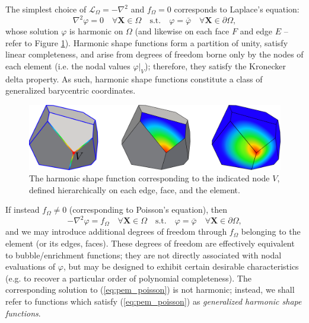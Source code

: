	The simplest choice of $\mathcal{L}_{\Omega} = -\nabla^2$ and $f_{\Omega} = 0$ corresponds to Laplace's equation:
	\begin{equation}
		\nabla^2 \varphi = 0 \quad \forall \mathbf{X} \in \Omega \quad \text{s.t.} \quad \varphi = \bar{\varphi} \quad \forall \mathbf{X} \in \partial \Omega,
		\label{eq:pem_laplace}
	\end{equation}
	whose solution $\varphi$ is harmonic on $\Omega$ (and likewise on each face $F$ and edge $E$ -- refer to Figure \ref{fig:harmonic_sfs}). Harmonic shape functions form a partition of unity, satisfy linear completeness, and arise from degrees of freedom borne only by the nodes of each element (i.e. the nodal values $\varphi|_V$); therefore, they satisfy the Kronecker delta property. As such, harmonic shape functions constitute a class of generalized barycentric coordinates.
	
\begin{figure} [!ht]
	\centering
	\includegraphics[width = 6.0in]{figures/harmonic_sfs.pdf}
	\caption{The harmonic shape function corresponding to the indicated node $V$, defined hierarchically on each edge, face, and the element.}
	\label{fig:harmonic_sfs}
\end{figure}
	
	If instead $f_{\Omega} \neq 0$ (corresponding to Poisson's equation), then
	\begin{equation}
		-\nabla^2 \varphi = f_{\Omega} \quad \forall \mathbf{X} \in \Omega \quad \text{s.t.} \quad \varphi = \bar{\varphi} \quad \forall \mathbf{X} \in \partial \Omega,
		\label{eq:pem_poisson}
	\end{equation}
	and we may introduce additional degrees of freedom through $f_{\Omega}$ belonging to the element (or its edges, faces). These degrees of freedom are effectively equivalent to bubble/enrichment functions; they are not directly associated with nodal evaluations of $\varphi$, but may be designed to exhibit certain desirable characteristics (e.g. to recover a particular order of polynomial completeness). The corresponding solution to (\ref{eq:pem_poisson}) is not harmonic; instead, we shall refer to functions which satisfy (\ref{eq:pem_poisson}) as \textit{generalized harmonic shape functions}.
	
